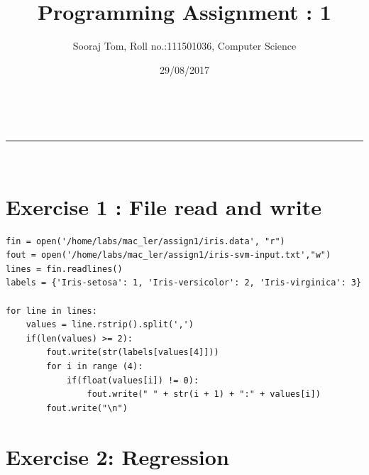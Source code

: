 \documentclass[a4paper,11pt]{article}
\makeatletter
\newcommand{\linia}{\rule{\linewidth}{0.5pt}}
\theoremstyle{mytheor}
\renewcommand{\maketitle}{
\begin{center}
\vspace{2ex}
{\huge \textsc{\@title}}
\vspace{1ex}
\\
\linia\\
\@author \hfill \@date
\vspace{4ex}
\end{center}
}
\makeatother
\begin{document}
\title{Programming Assignment : 1}

\author{Sooraj Tom, Roll no.:111501036, Computer Science}

\date{29/08/2017}

\maketitle

\section*{Exercise 1 : File read and write}

\begin{lstlisting}[label={list:first},caption=File reading and writing.]
fin = open('/home/labs/mac_ler/assign1/iris.data', "r")
fout = open('/home/labs/mac_ler/assign1/iris-svm-input.txt',"w")
lines = fin.readlines()
labels = {'Iris-setosa': 1, 'Iris-versicolor': 2, 'Iris-virginica': 3}

for line in lines:
    values = line.rstrip().split(',')
    if(len(values) >= 2):
        fout.write(str(labels[values[4]]))
        for i in range (4):
            if(float(values[i]) != 0):
                fout.write(" " + str(i + 1) + ":" + values[i])
        fout.write("\n")
\end{lstlisting}

\section*{Exercise 2: Regression}
\end{document}
